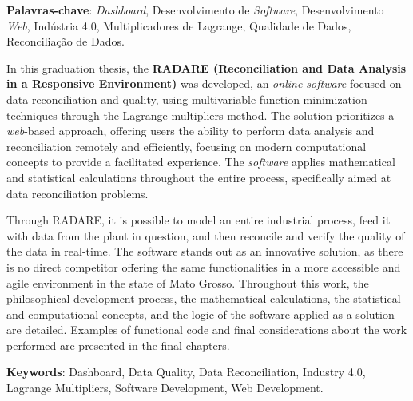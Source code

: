 \vspace{1.5ex}

{\bf Palavras-chave}: \textit{Dashboard}, Desenvolvimento de \textit{Software}, Desenvolvimento \textit{Web}, Indústria 4.0, Multiplicadores de Lagrange, Qualidade de Dados, Reconciliação de Dados.


%
%

In this graduation thesis, the \textbf{RADARE (Reconciliation and Data Analysis in a Responsive Environment)} was developed, an \textit{online software} focused on data reconciliation and quality, using multivariable function minimization techniques through the Lagrange multipliers method. The solution prioritizes a \textit{web}-based approach, offering users the ability to perform data analysis and reconciliation remotely and efficiently, focusing on modern computational concepts to provide a facilitated experience. The \textit{software} applies mathematical and statistical calculations throughout the entire process, specifically aimed at data reconciliation problems.

Through RADARE, it is possible to model an entire industrial process, feed it with data from the plant in question, and then reconcile and verify the quality of the data in real-time. The software stands out as an innovative solution, as there is no direct competitor offering the same functionalities in a more accessible and agile environment in the state of Mato Grosso. Throughout this work, the philosophical development process, the mathematical calculations, the statistical and computational concepts, and the logic of the software applied as a solution are detailed. Examples of functional code and final considerations about the work performed are presented in the final chapters.

\vspace{1.5ex}

{\bf Keywords}: Dashboard, Data Quality, Data Reconciliation, Industry 4.0, Lagrange Multipliers, Software Development, Web Development.

